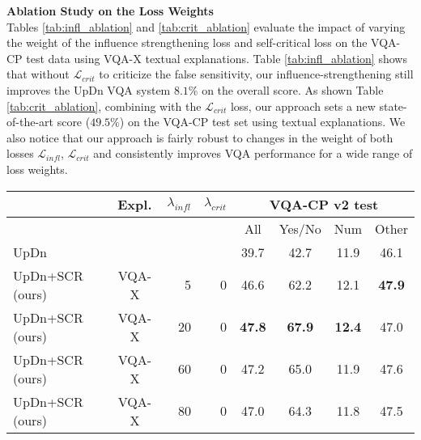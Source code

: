 \documentclass{article}
\begin{document}
\noindent\textbf{Ablation Study on the Loss Weights}\\
Tables \ref{tab:infl_ablation} and \ref{tab:crit_ablation} evaluate the impact of varying the weight of the influence strengthening loss and self-critical loss on the VQA-CP test data using VQA-X textual explanations. Table \ref{tab:infl_ablation} shows that without $\mathcal{L}_{crit}$ to criticize the false sensitivity, our influence-strengthening still improves the UpDn VQA system $8.1\%$ on the overall score. As shown Table \ref{tab:crit_ablation}, combining with the $\mathcal{L}_{crit}$ loss, our approach sets a new state-of-the-art score ($49.5\%$) on the VQA-CP test set using textual explanations. We also notice that our approach is fairly robust to changes in the weight of both losses $\mathcal{L}_{infl}$, $\mathcal{L}_{crit}$ and consistently improves VQA performance for a wide range of loss weights.

\begin{table*}[!t]
\centering
\begin{tabular}{l|c|rr|cccc}
\hline \toprule
                    & Expl. & $\mathcal{\lambda}_{infl}$ & $\mathcal{\lambda}_{crit}$ & \multicolumn{4}{c}{VQA-CP v2 test}\\    \hline
                    &       &    &    & All     & Yes/No &  Num  & Other \\ \hline\hline
UpDn    \cite{anderson2017bottom}            &       &     &  & 39.7   &  42.7  & 11.9  & 46.1  \\ \hline
UpDn+SCR (ours)   &  VQA-X  & 5     & 0& 46.6   &  62.2  & 12.1  & \textbf{47.9}  \\
UpDn+SCR (ours)   &  VQA-X  & 20  & 0& \textbf{47.8}   &  \textbf{67.9}  & \textbf{12.4}  & 47.0  \\
UpDn+SCR (ours)   &  VQA-X  & 60 & 0& 47.2   &  65.0  & 11.9  & 47.6  \\
UpDn+SCR (ours)   &  VQA-X  & 80 & 0& 47.0   &  64.3  & 11.8  & 47.5  \\ \bottomrule
\end{tabular}
\caption{Ablation study on various influence-strengthening loss weights on VQA-CP test data (.  The ``Expl.'' column shows the source of explanations for training the VQA systems. The ``$\mathcal{\lambda}_{infl}$'' column shows the influence-strengthening loss weight. The ``$\mathcal{\lambda}_{crit}$'' column shows the self-critical loss weight. SCR is the short hand for our self-critical reasoning approach.}
\label{tab:infl_ablation}
\end{table*}
\end{document}
